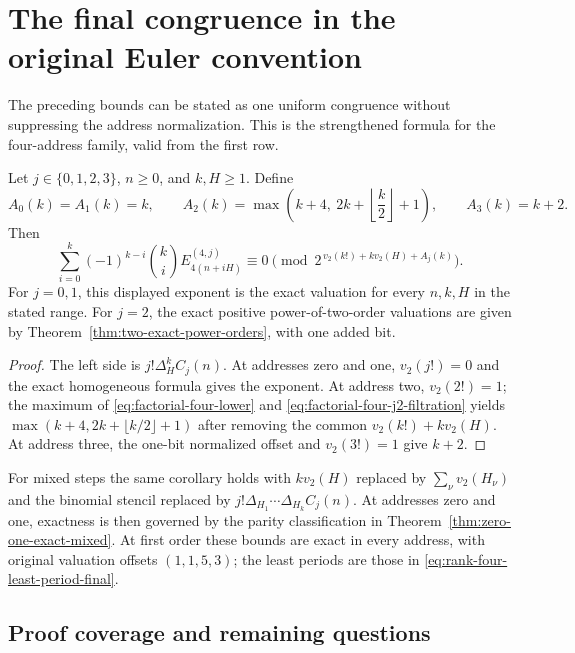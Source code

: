 \section{The final congruence in the original Euler convention}
\label{sec:final-original-congruence}

The preceding bounds can be stated as one uniform congruence without
suppressing the address normalization. This is the strengthened formula
for the four-address family, valid from the first row.

\begin{corollary}
\label{cor:final-euler-congruence}
Let $j\in\{0,1,2,3\}$, $n\geq0$, and $k,H\geq1$. Define
\[
 A_0(k)=A_1(k)=k,\qquad
 A_2(k)=\max\left(k+4,\ 2k+\left\lfloor\frac k2\right\rfloor+1\right),
 \qquad A_3(k)=k+2.
\]
Then
\begin{equation}
 \boxed{\displaystyle
 \sum_{i=0}^k(-1)^{k-i}\binom ki E_{4(n+iH)}^{(4,j)}
       \equiv0\pmod{2^{\,v_2(k!)+k v_2(H)+A_j(k)}}.}
 \label{eq:boxed-final-euler-congruence}
\end{equation}
For $j=0,1$, this displayed exponent is the exact valuation for every
$n,k,H$ in the stated range. For $j=2$, the exact positive
power-of-two-order valuations are given by
Theorem~\ref{thm:two-exact-power-orders}, with one added bit.
\end{corollary}

\begin{proof}
The left side is $j!\Delta_H^kC_j(n)$.
At addresses zero and one, $v_2(j!)=0$ and the exact homogeneous
formula gives the exponent. At address two, $v_2(2!)=1$; the maximum
of \eqref{eq:factorial-four-lower} and
\eqref{eq:factorial-four-j2-filtration} yields
$\max(k+4,2k+\lfloor k/2\rfloor+1)$ after removing the common
$v_2(k!)+k v_2(H)$. At address three, the one-bit normalized offset
and $v_2(3!)=1$ give $k+2$.
\end{proof}

For mixed steps the same corollary holds with $k v_2(H)$ replaced by
$\sum_\nu v_2(H_\nu)$ and the binomial stencil replaced by
$j!\Delta_{H_1}\cdots\Delta_{H_k}C_j(n)$.
At addresses zero and one, exactness is then governed by the parity
classification in Theorem~\ref{thm:zero-one-exact-mixed}.
At first order these bounds are exact in every address, with original
valuation offsets $(1,1,5,3)$; the least periods are those in
\eqref{eq:rank-four-least-period-final}.

\subsection{Proof coverage and remaining questions}

